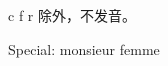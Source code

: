 \documentclass[../templates/main.tex]{subfiles}
\begin{document}
c f r 除外，不发音。
\begin{pronuciation}
 Special: monsieur femme
\end{pronuciation}
\end{document}
